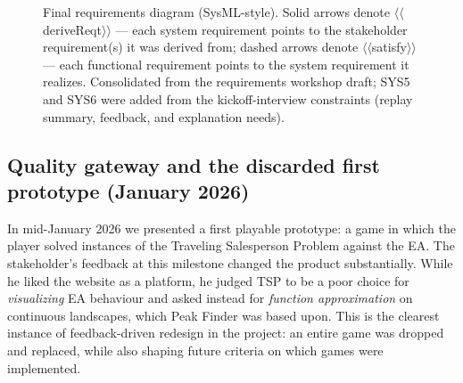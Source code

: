 \documentclass[conference]{IEEEtran}
\begin{document}
\begin{figure}[t]
{}
\caption{Final requirements diagram (SysML-style). Solid arrows denote \textsf{\footnotesize$\langle\!\langle$deriveReqt$\rangle\!\rangle$} --- each system requirement points to the stakeholder requirement(s) it was derived from; dashed arrows denote \textsf{\footnotesize$\langle\!\langle$satisfy$\rangle\!\rangle$} --- each functional requirement points to the system requirement it realizes. Consolidated from the requirements workshop draft; SYS5 and SYS6 were added from the kickoff-interview constraints (replay summary, feedback, and explanation needs).}
\label{fig:req}
\end{figure}

\subsection{Quality gateway and the discarded first prototype (January 2026)}
In mid-January 2026 we presented a first playable prototype: a game in which the player solved instances of the Traveling Salesperson Problem against the EA. The stakeholder's feedback at this milestone changed the product substantially. While he liked the website as a platform, he judged TSP to be a poor choice for \emph{visualizing} EA behaviour and asked instead for \emph{function approximation} on continuous landscapes, which Peak Finder was based upon. This is the clearest instance of feedback-driven redesign in the project: an entire game was dropped and replaced, while also shaping future criteria on which games were implemented. 
\end{document}

